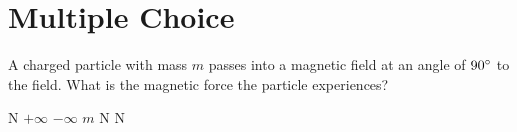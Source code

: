 \documentclass[a4paper,12pt]{exam}
\begin{document}
\begin{center}
\end{center}

\vspace{5mm}


\vspace{5mm}


\section{Multiple Choice}
\begin{questions}

\question A charged particle with mass $m$ passes into a magnetic field at an angle of $90 \degree$ to the field. What is the magnetic force the particle experiences?

\begin{oneparchoices}
  N
 \choice $+ \infty$
 \choice $- \infty$
 \choice $m$ N
  N
\end{oneparchoices}


\end{questions}
\end{document}
